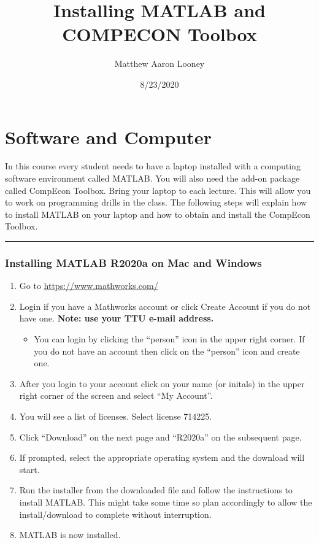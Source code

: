 \documentclass[
]{article}
\title{Installing MATLAB and COMPECON Toolbox}
\author{Matthew Aaron Looney}
\date{8/23/2020}
\providecommand{\tightlist}{%
  \setlength{\itemsep}{0pt}\setlength{\parskip}{0pt}}
\begin{document}
\maketitle

\hypertarget{software-and-computer}{%
\section{Software and Computer}\label{software-and-computer}}

In this course every student needs to have a laptop installed with a
computing software environment called MATLAB. You will also need the
add-on package called CompEcon Toolbox. Bring your laptop to each
lecture. This will allow you to work on programming drills in the class.
The following steps will explain how to install MATLAB on your laptop
and how to obtain and install the CompEcon Toolbox.

\begin{center}\rule{0.5\linewidth}{0.5pt}\end{center}

\hypertarget{installing-matlab-r2020a-on-mac-and-windows}{%
\subsubsection{Installing MATLAB R2020a on Mac and
Windows}\label{installing-matlab-r2020a-on-mac-and-windows}}

\begin{enumerate}
\def\labelenumi{\arabic{enumi}.}
\item
  Go to \url{https://www.mathworks.com/}
\item
  Login if you have a Mathworks account or click Create Account if you
  do not have one. \textbf{Note: use your TTU e-mail address.}

  \begin{itemize}
  \tightlist
  \item
    You can login by clicking the ``person'' icon in the upper right
    corner. If you do not have an account then click on the ``person''
    icon and create one.
  \end{itemize}
\item
  After you login to your account click on your name (or initals) in the
  upper right corner of the screen and select ``My Account''.
\item
  You will see a list of licenses. Select license 714225.
\item
  Click ``Download'' on the next page and ``R2020a'' on the subsequent
  page.
\item
  If prompted, select the appropriate operating system and the download
  will start.
\item
  Run the installer from the downloaded file and follow the instructions
  to install MATLAB. This might take some time so plan accordingly to
  allow the install/download to complete without interruption.
\item
  MATLAB is now installed.
\end{enumerate}
\end{document}
